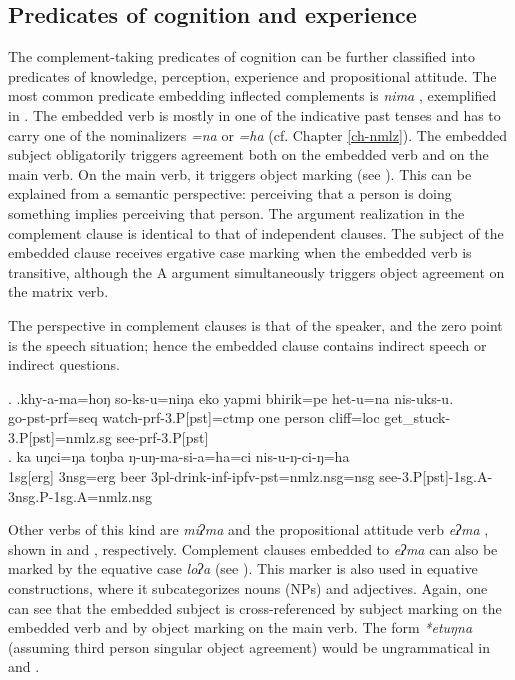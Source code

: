 \subsection{Predicates of cognition and experience}\label{cognition-pred}

The complement-taking predicates of cognition can be further classified into predicates of knowledge, perception, experience and propositional attitude. 
 The most common predicate embedding inflected complements is \emph{nima} , exemplified in \Next. The embedded verb is mostly in one of the indicative past tenses and has to carry one of the nominalizers \emph{=na} or \emph{=ha} (cf. Chapter \ref{ch-nmlz}). The embedded subject obligatorily triggers agreement both on the embedded verb and on the main verb. On the main verb, it triggers object marking (see \Next[b]). This can be explained from a semantic perspective: perceiving that a person is doing something implies perceiving that person. The argument realization in the complement clause is identical to that of independent clauses. The subject of the embedded clause receives ergative case marking when the embedded verb is transitive, although the A argument simultaneously triggers object agreement on the matrix verb. 
 
 The perspective in complement clauses is that of the speaker, and the zero point is the speech situation; hence the embedded clause contains indirect speech or indirect questions.

\ex. \ag.khy-a-ma=hoŋ          so-ks-u=niŋa                 eko yapmi  bhirik=pe    het-u=na                      nis-uks-u.\\
go{\sc -pst-prf=seq}  watch{\sc -prf-3.P[pst]=ctmp} one person cliff{\sc =loc} get\_stuck{\sc -3.P[pst]=nmlz.sg} see{\sc -prf-3.P[pst]}\\
 
\bg. ka uŋci=ŋa toŋba ŋ-uŋ-ma-si-a=ha=ci nis-u-ŋ-ci-ŋ=ha\\
{\sc 1sg[erg]} {\sc 3nsg=erg} beer  {\sc 3pl}-drink-{\sc inf-ipfv-pst=nmlz.nsg=nsg} see{\sc -3.P[pst]-1sg.A-3nsg.P-1sg.A=nmlz.nsg}\\


Other verbs of this kind are  \emph{miʔma}  and the propositional attitude verb \emph{eʔma} , shown in \Next and \NNext[a], respectively.  Complement clauses embedded to  \emph{eʔma} can also be marked by the equative case  \emph{loʔa}  (see \NNext[b]). This marker is also used in equative constructions, where it subcategorizes nouns (NPs) and adjectives.  Again, one can see that the embedded subject is cross-referenced by subject marking on the embedded verb and by object marking on the main verb. The form \emph{*etuŋna} (assuming third person singular  object agreement) would be ungrammatical in \NNext[b] and \NNext[c]. 

